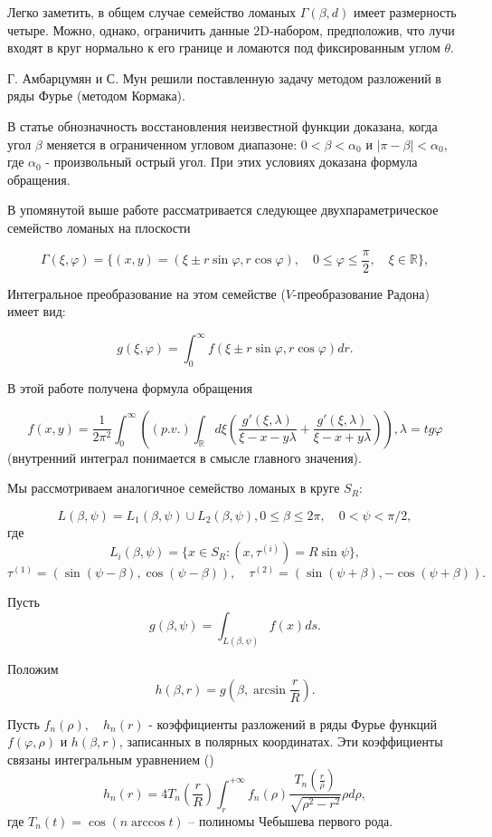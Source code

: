 Легко заметить, в общем случае семейство ломаных $\Gamma(\beta,d)$ имеет размерность четыре. Можно, однако, ограничить данные 2D-набором, предположив, что лучи входят в круг нормально к его границе и ломаются под фиксированным углом $\theta$.

Г. Амбарцумян и С. Мун \cite{mzg-Ambartsoumian1} решили поставленную задачу методом разложений в ряды Фурье (методом Кормака).

В статье \cite{mzg-Medzhidov2} обнозначность восстановления неизвестной функции доказана, когда угол $\beta$ меняется в ограниченном угловом диапазоне: $0<\beta<\alpha_0$ и $|\pi-\beta|<\alpha_0$, где $\alpha_0$ - произвольный острый угол. При этих условиях доказана формула обращения.

В упомянутой выше работе \cite{mzg-Truong} рассматривается следующее двухпараметрическое семейство ломаных на плоскости

\begin{equation}
\label{mzg-eq-one4}
\Gamma(\xi,\varphi)=\{(x,y)=(\xi\pm r \sin \varphi, r \cos \varphi),\quad 0\leq\varphi\leq\frac{\pi}{2}, \quad \xi\in\mathbb R\},
\end{equation}

Интегральное преобразование на этом семействе ($V$-преобразование Радона) имеет вид:

$$g(\xi,\varphi)=\int_0^\infty f(\xi\pm r \sin \varphi, r \cos \varphi)dr.$$

В этой работе получена формула обращения

$$f(x,y)=\frac{1}{2\pi^2}\int_0^\infty \left( (p.v.)\int_\mathbb R d\xi\left(\frac{g'(\xi,\lambda)}{\xi-x-y\lambda}+\frac{g'(\xi,\lambda)}{\xi-x+y\lambda}\right)\right), \lambda=tg \varphi$$
(внутренний интеграл понимается в смысле главного значения).

Мы рассмотриваем аналогичное семейство ломаных в круге $S_R$:

$$L(\beta,\psi)=L_1(\beta,\psi)\cup L_2(\beta,\psi), 0\leq \beta\leq2\pi,\quad 0<\psi<\pi/2,$$
где
$$L_i(\beta,\psi)=\{x\in S_R:(x,\tau^{(i)})=R \sin \psi\},$$
$$\tau^{(1)}=(\sin(\psi-\beta), \cos(\psi-\beta)),\quad \tau^{(2)}=(\sin(\psi+\beta), -\cos(\psi+\beta)).$$

Пусть
$$g(\beta,\psi)=\int_{L(\beta,\psi)}f(x)ds.$$

Положим
$$h(\beta,r)=g\left(\beta, \arcsin \frac{r}{R}\right).$$

Пусть $f_n(\rho), \quad h_n(r)$ - коэффициенты разложений в ряды Фурье функций $f(\varphi,\rho)$ и $h(\beta,r)$, записанных в полярных координатах.
Эти коэффициенты связаны интегральным уравнением (\cite{mzg-Medzhidov1})
$$h_n(r)=4T_n\left(\frac{r}{R}\right)\int_r^{+\infty}f_n(\rho)\frac{T_n\left(\frac{r}{\rho}\right)}{\sqrt{\rho^2-r^2}}\rho d\rho,$$
где $T_n(t)=\cos (n \arccos t)$ -- полиномы Чебышева первого рода.

